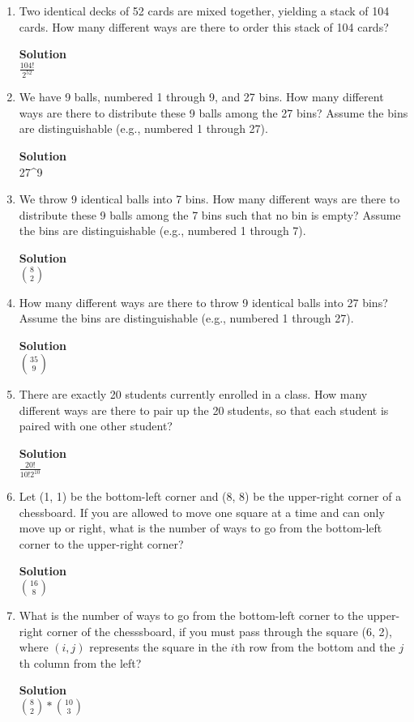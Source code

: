 \documentclass[11pt]{article}
\newenvironment{Parts}{\begin{enumerate}[label=(\alph*)]}{\end{enumerate}}
\newcommand*{\Part}{\item}
\newenvironment{Answer}{\vspace{10pt}\begin{mdframed}\textbf{Solution}\\}{\end{mdframed}\vfill\pagebreak[3]}
\newenvironment{Answer}{\vspace{10pt}}{\vfill\pagebreak[3]}
\begin{document}
\begin{Parts}
\Part Two identical decks of 52 cards are mixed together, yielding a
  stack of 104 cards.
  How many different ways are there to order this stack of 104 cards?
\begin{Answer}
$\frac{104!}{2^{52}}$
\end{Answer}

\Part We have 9 balls, numbered 1 through 9, and 27 bins.
  How many different ways are there to distribute these 9 balls among
  the 27 bins? Assume the bins are distinguishable (e.g., numbered 1
  through 27).
\begin{Answer}
27^9
\end{Answer}

\Part We throw 9 identical balls into 7 bins.
  How many different ways are there to distribute these 9 balls among
  the 7 bins such that no bin is empty? Assume the bins are
  distinguishable (e.g., numbered 1 through 7).
\begin{Answer}
$\binom{8}{2}$
\end{Answer}

\Part How many different ways are there to throw 9 identical balls
  into 27 bins? Assume the bins are distinguishable (e.g., numbered 1
  through 27).
\begin{Answer}
$\binom{35}{9}$
\end{Answer}

\Part There are exactly 20 students currently enrolled in a class.
  How many different ways are there to pair up the 20 students, so
  that each student is paired with one other student?
\begin{Answer}
$\frac{20!}{10!2^{10}}$
\end{Answer}

\Part Let (1, 1) be the bottom-left corner and (8, 8) be the upper-right 
corner of a chessboard. If you are allowed to move one square at a time and
can only move up or right, what is the number of ways to go from the bottom-left corner to 
the upper-right corner? 
\begin{Answer}
$\binom{16}{8}$
\end{Answer}

\Part What is the number of ways to go from the bottom-left corner to 
the upper-right corner of the chesssboard, if you must pass through the square 
(6, 2), where $(i, j)$ represents the square in the $i$th row from the
bottom and the $j$th column from the left?
\begin{Answer}
$\binom{8}{2}*\binom{10}{3}$
\end{Answer}


\end{Parts}
\end{document}
